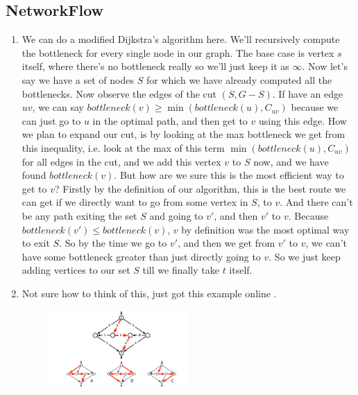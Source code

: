 \documentclass[12pt]{report}
\begin{document}
\subsection*{\Large\bfseries NetworkFlow}
\begin{enumerate}[label=\textbf{\arabic*.}]

  \item We can do a modified Dijkstra's algorithm here. We'll recursively compute the bottleneck for every single node in our graph.
  The base case is vertex $s$ itself, where there's no bottleneck really so we'll just keep it as $\infty$. Now let's say we have a 
  set of nodes $S$ for which we have already computed all the bottlenecks. Now observe the edges of the cut $(S, G-S)$. If have an 
  edge $uv$, we can say $bottleneck(v) \geq \min(bottleneck(u), C_{uv})$ because we can just go to $u$ in the optimal path, and then 
  get to $v$ using this edge. How we plan to expand our cut, is by looking at the max bottleneck we get from this inequality, i.e.
  look at the max of this term $\min(bottleneck(u), C_{uv})$ for all edges in the cut, and we add this vertex $v$ to $S$ now, and 
  we have found $bottleneck(v)$. But how are we sure this is the most efficient way to get to $v$? Firstly by the definition of our 
  algorithm, this is the best route we can get if we directly want to go from some vertex in $S$, to $v$. And there can't be any path
  exiting the set $S$ and going to $v'$, and then $v'$ to $v$. Because $bottleneck(v') \leq bottleneck(v)$, $v$ by definition was the 
  most optimal way to exit $S$. So by the time we go to $v'$, and then we get from $v'$ to $v$, we can't have some bottleneck greater
  than just directly going to $v$. So we just keep adding vertices to our set $S$ till we finally take $t$ itself.

  \item Not sure how to think of this, just got this example online .
  
  \begin{figure}[H]
    \centering
    \includegraphics[width=0.5\textwidth]{IrrationalCapacities.png}  
  \end{figure}


\end{enumerate}
\end{document}
